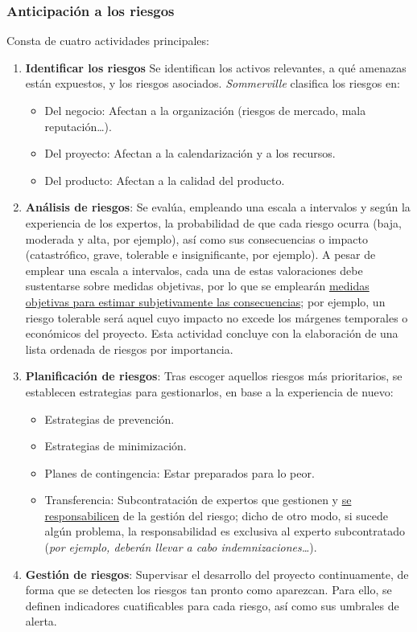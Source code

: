 \subsubsection{Anticipación a los riesgos}

Consta de cuatro actividades principales:

\begin{enumerate}
   \item \textbf{Identificar los riesgos} Se identifican los activos relevantes, a qué amenazas están expuestos, y los riesgos asociados. \textit{Sommerville} clasifica los riesgos en:
      
      \begin{itemize}
         \item Del negocio: Afectan a la organización (riesgos de mercado, mala reputación\ldots).
         \item Del proyecto: Afectan a la calendarización y a los recursos.
         \item Del producto: Afectan a la calidad del producto.
      \end{itemize}

   \item \textbf{Análisis de riesgos}: Se evalúa, empleando una escala a intervalos y según la experiencia de los expertos, la probabilidad de que cada riesgo ocurra (baja, moderada y alta, por ejemplo), así como sus consecuencias o impacto (catastrófico, grave, tolerable e insignificante, por ejemplo). A pesar de emplear una escala a intervalos, cada una de estas valoraciones debe sustentarse sobre medidas objetivas, por lo que se emplearán \uline{medidas objetivas para estimar subjetivamente las consecuencias}; por ejemplo, un riesgo tolerable será aquel cuyo impacto no excede los márgenes temporales o económicos del proyecto. Esta actividad concluye con la elaboración de una lista ordenada de riesgos por importancia.

   \item \textbf{Planificación de riesgos}:
         Tras escoger aquellos riesgos más prioritarios, se establecen estrategias para gestionarlos, en base a la experiencia de nuevo:
         \begin{itemize}
            \item Estrategias de prevención.
            \item Estrategias de minimización.
            \item Planes de contingencia: Estar preparados para lo peor.
            \item Transferencia: Subcontratación de expertos que gestionen y \uline{se responsabilicen} de la gestión del riesgo; dicho de otro modo, si sucede algún problema, la responsabilidad es exclusiva al experto subcontratado (\textit{por ejemplo, deberán llevar a cabo indemnizaciones\ldots}).
         \end{itemize}
   \item \textbf{Gestión de riesgos}: Supervisar el desarrollo del proyecto continuamente, de forma que se detecten los riesgos tan pronto como aparezcan. Para ello, se definen indicadores cuatificables para cada riesgo, así como sus umbrales de alerta.
\end{enumerate}

